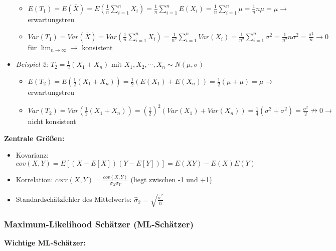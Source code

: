 \begin{itemize}
    \begin{itemize}
        \item \(E(T_1)=E(\bar{X})=E(\frac{1}{n}\sum_{i=1}^{n}X_i)=\frac{1}{n}\sum_{i=1}^{n}E(X_i)=\frac{1}{n}\sum_{i=1}^{n}\mu=\frac{1}{n}n\mu=\mu \rightarrow\) erwartungstreu
        \item \(Var(T_1)=Var(\bar{X})=Var(\frac{1}{n}\sum_{i=1}^{n}X_i)=\frac{1}{n^2}\sum_{i=1}^{n}Var(X_i)=\frac{1}{n^2}\sum_{i=1}^{n}\sigma^2=\frac{1}{n^2}n\sigma^2=\frac{\sigma^2}{n} \rightarrow 0\) für \(\lim_{n\rightarrow\infty}\rightarrow\) konsistent
    \end{itemize} 
    \item \emph{Beispiel 2:} \(T_2=\frac{1}{2}(X_1+X_n)\text{ mit }X_1, X_2, \cdots, X_n\sim N(\mu, \sigma)\)
    \begin{itemize}
        \item \(E(T_2)=E(\frac{1}{2}(X_1+X_n))=\frac{1}{2}(E(X_1)+E(X_n))=\frac{1}{2}(\mu+\mu)=\mu \rightarrow\) erwartungstreu
        \item \(Var(T_2)=Var(\frac{1}{2}(X_1+X_n))=\left(\frac{1}{2}\right)^2(Var(X_1)+Var(X_n))=\frac{1}{4}(\sigma^2+\sigma^2)=\frac{\sigma^2}{2} \nrightarrow  0 \rightarrow\) nicht konsistent 
    \end{itemize}
\end{itemize}

\textbf{Zentrale Größen:}
\begin{itemize}
    \item Kovarianz: \(cov(X,Y)=E[(X-E[X])(Y-E[Y])]=E(XY)-E(X)E(Y)\)
    \item Korrelation: \(corr(X,Y)=\frac{cov(X,Y)}{\sigma_X\sigma_Y}\) (liegt zwischen -1 und +1)
    \item Standardschätzfehler des Mittelwerts: \(\hat{\sigma}_{\bar{x}}=\sqrt{\frac{\hat{\sigma}^2}{n}}\)
\end{itemize}


\subsubsection{Maximum-Likelihood Schätzer (ML-Schätzer)}

\textbf{Wichtige ML-Schätzer:}

